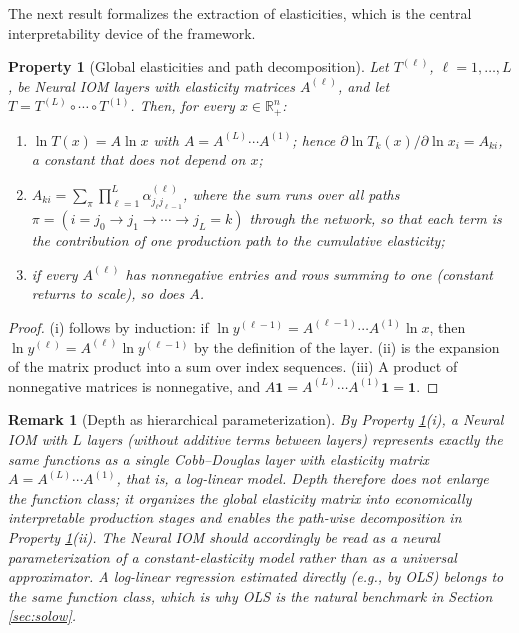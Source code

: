 \documentclass[preprint,12pt,authoryear]{sn-jnl}
\newtheorem{property}{Property}
\newtheorem{remark}{Remark}
\begin{document}
The next result formalizes the extraction of elasticities, which is the central interpretability device of the framework.

\begin{property}[Global elasticities and path decomposition] \label{prop:elasticity}
Let $T^{(\ell)}$, $\ell=1,\dots,L$, be Neural IOM layers with elasticity matrices $A^{(\ell)}$, and let $T = T^{(L)}\circ\cdots\circ T^{(1)}$. Then, for every $x\in\mathbb{R}^n_{+}$:
\begin{enumerate} [leftmargin=*, itemsep=0pt, topsep=2pt, parsep=0pt]
    \item[(i)] $\ln T(x) = A \ln x$ with $A = A^{(L)}\cdots A^{(1)}$; hence $\partial \ln T_k(x)/\partial \ln x_i = A_{ki}$, a constant that does not depend on $x$;
    \item[(ii)] $A_{ki} = \sum_{\pi} \prod_{\ell=1}^{L} \alpha^{(\ell)}_{j_\ell j_{\ell-1}}$, where the sum runs over all paths $\pi = (i = j_0 \to j_1 \to \cdots \to j_L = k)$ through the network, so that each term is the contribution of one production path to the cumulative elasticity;
    \item[(iii)] if every $A^{(\ell)}$ has nonnegative entries and rows summing to one (constant returns to scale), so does $A$.
\end{enumerate}
\end{property}

\begin{proof}
(i) follows by induction: if $\ln y^{(\ell-1)} = A^{(\ell-1)}\cdots A^{(1)} \ln x$, then $\ln y^{(\ell)} = A^{(\ell)} \ln y^{(\ell-1)}$ by the definition of the layer. (ii) is the expansion of the matrix product into a sum over index sequences. (iii) A product of nonnegative matrices is nonnegative, and $A\mathbf{1} = A^{(L)}\cdots A^{(1)}\mathbf{1} = \mathbf{1}$.
\end{proof}

\begin{remark}[Depth as hierarchical parameterization] \label{rem:collapse}
By Property \ref{prop:elasticity}(i), a Neural IOM with $L$ layers (without additive terms between layers) represents exactly the same functions as a single Cobb--Douglas layer with elasticity matrix $A = A^{(L)}\cdots A^{(1)}$, that is, a log-linear model. Depth therefore does not enlarge the function class; it organizes the global elasticity matrix into economically interpretable production stages and enables the path-wise decomposition in Property \ref{prop:elasticity}(ii). The Neural IOM should accordingly be read as a neural parameterization of a constant-elasticity model rather than as a universal approximator. A log-linear regression estimated directly (e.g., by OLS) belongs to the same function class, which is why OLS is the natural benchmark in Section \ref{sec:solow}.
\end{remark}
\end{document}
